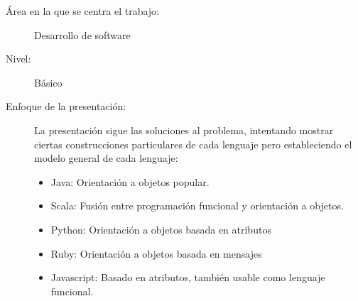\begin{description}
 \item[Área en la que se centra el trabajo:] Desarrollo de software
 \item[Nivel:] Básico
 \item[Enfoque de la presentación:] La presentación sigue las soluciones al
   problema, intentando mostrar ciertas construcciones particulares de cada
   lenguaje pero estableciendo el modelo general de cada lenguaje:
  \begin{itemize}
   \item Java: Orientación a objetos popular.
   \item Scala: Fusión entre programación funcional y orientación a objetos.
   \item Python: Orientación a objetos basada en atributos
   \item Ruby: Orientación a objetos basada en mensajes
   \item Javascript: Basado en atributos, también usable como lenguaje
     funcional.
  \end{itemize}
\end{description}






